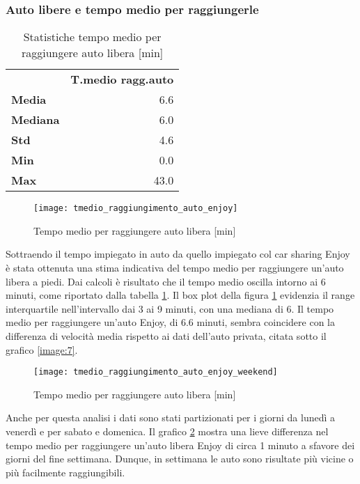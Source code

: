 \subsubsection{Auto libere e tempo medio per raggiungerle}

\begin{table}[H]
\centering
\begin{tabular}{ | l r | }
\hline
& \textbf{T.medio ragg.auto} \\
\textbf{Media}   &  6.6 \\
\textbf{Mediana} &  6.0 \\
\textbf{Std}     &  4.6 \\
\textbf{Min}     &  0.0 \\ 
\textbf{Max}     & 43.0 \\
\hline
\end{tabular}
\caption{Statistiche tempo medio per raggiungere auto libera [min]}
\label{table:4}
\end{table}

\begin{figure}[H]
	\texttt{[image: tmedio\_raggiungimento\_auto\_enjoy]}
	\caption{Tempo medio per raggiungere auto libera [min]}
	\label{image:8}
\end{figure}

Sottraendo il tempo impiegato in auto da quello impiegato col car sharing Enjoy è stata ottenuta una stima indicativa del tempo medio per raggiungere un'auto libera a piedi. Dai calcoli è risultato che il tempo medio oscilla intorno ai 6 minuti, come riportato dalla tabella \ref{table:4}. Il box plot della figura \ref{image:8} evidenzia il range interquartile nell'intervallo dai 3 ai 9 minuti, con una mediana di 6. Il tempo medio per raggiungere un'auto Enjoy, di 6.6 minuti, sembra coincidere con la differenza di velocità media rispetto ai dati dell'auto privata, citata sotto il grafico \ref{image:7}.

\begin{figure}[H]
	\texttt{[image: tmedio\_raggiungimento\_auto\_enjoy\_weekend]}
	\caption{Tempo medio per raggiungere auto libera [min]}
	\label{image:21}
\end{figure}

Anche per questa analisi i dati sono stati partizionati per i giorni da lunedì a venerdì e per sabato e domenica. Il grafico \ref{image:21} mostra una lieve differenza nel tempo medio per raggiungere un'auto libera Enjoy di circa 1 minuto a sfavore dei giorni del fine settimana. Dunque, in settimana le auto sono risultate più vicine o più facilmente raggiungibili.

